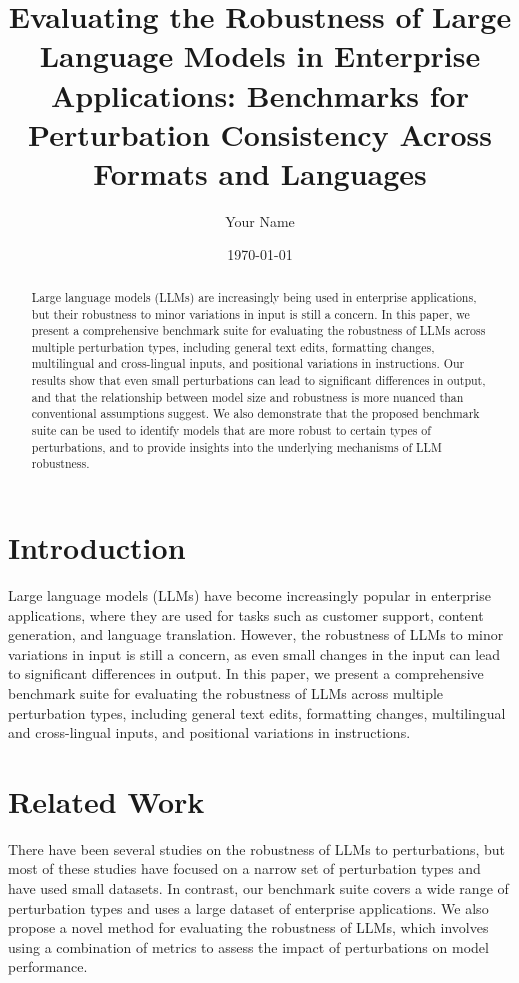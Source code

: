 \documentclass{article}
\title{Evaluating the Robustness of Large Language Models in Enterprise Applications: Benchmarks for Perturbation Consistency Across Formats and Languages}
\author{Your Name}
\date{\today}
\begin{document}
\maketitle

\begin{abstract}
Large language models (LLMs) are increasingly being used in enterprise applications, but their robustness to minor variations in input is still a concern. In this paper, we present a comprehensive benchmark suite for evaluating the robustness of LLMs across multiple perturbation types, including general text edits, formatting changes, multilingual and cross-lingual inputs, and positional variations in instructions. Our results show that even small perturbations can lead to significant differences in output, and that the relationship between model size and robustness is more nuanced than conventional assumptions suggest. We also demonstrate that the proposed benchmark suite can be used to identify models that are more robust to certain types of perturbations, and to provide insights into the underlying mechanisms of LLM robustness.
\end{abstract}

\section{Introduction}
Large language models (LLMs) have become increasingly popular in enterprise applications, where they are used for tasks such as customer support, content generation, and language translation. However, the robustness of LLMs to minor variations in input is still a concern, as even small changes in the input can lead to significant differences in output. In this paper, we present a comprehensive benchmark suite for evaluating the robustness of LLMs across multiple perturbation types, including general text edits, formatting changes, multilingual and cross-lingual inputs, and positional variations in instructions.

\section{Related Work}
There have been several studies on the robustness of LLMs to perturbations, but most of these studies have focused on a narrow set of perturbation types and have used small datasets. In contrast, our benchmark suite covers a wide range of perturbation types and uses a large dataset of enterprise applications. We also propose a novel method for evaluating the robustness of LLMs, which involves using a combination of metrics to assess the impact of perturbations on model performance.
\end{document}

